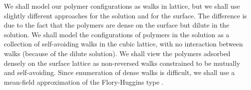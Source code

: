 \documentclass[journal=mamobx,manuscript=article]{achemso}
\begin{document}




%



We shall model our polymer configurations as walks in lattice, but we shall use slightly different approaches for the solution and for the surface.
The difference is due to the fact that the polymers are dense on the surface but 
dilute in the solution.  We shall model the configurations of polymers in the solution as a collection of 
self-avoiding walks in the cubic lattice, with no interaction between walks (because of the dilute solution).
We shall view the polymers adsorbed densely on the surface lattice as non-reversed walks constrained to
be mutually and self-avoiding.  Since enumeration of
dense walks is difficult, we shall use a mean-field 
approximation of the Flory-Huggins type \cite{Flory1953}.
\end{document}
